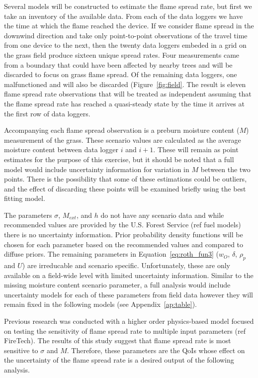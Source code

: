 \documentclass[11pt]{article}
\begin{document}
Several models will be constructed to estimate the flame spread rate, but first we take an inventory of the available data. From each of the data loggers we have the time at which the flame reached the device. If we consider flame spread in the downwind direction and take only point-to-point observations of the travel time from one device to the next, then the twenty data loggers embeded in a grid on the grass field produce sixteen unique spread rates. Four measurements came from a boundary that could have been affected by nearby trees and will be discarded to focus on grass flame spread. Of the remaining data loggers, one malfunctioned and will also be discarded (Figure~\ref{fig:field}. The result is eleven flame spread rate observations that will be treated as independent assuming that the flame spread rate has reached a quasi-steady state by the time it arrives at the first row of data loggers.

Accompanying each flame spread observation is a preburn moisture content ($M$) measurement of the grass. These scenario values are calculated as the average moisture content between data logger $i$ and $i+1$. These will remain as point estimates for the purpose of this exercise, but it should be noted that a full model would include uncertainty information for variation in $M$ between the two points. There is the possibility that some of these estimations could be outliers, and the effect of discarding these points will be examined briefly using the best fitting model.

The parameters $\sigma$, $M_{ext}$, and $h$ do not have any scenario data and while recommended values are provided by the U.S. Forest Service (ref fuel models) there is no uncertainty information. Prior probability density functions will be chosen for each parameter based on the recommended values and compared to diffuse priors. The remaining parameters in Equation~\ref{eq:roth_fun3} ($w_O$, $\delta$, $\rho_p$ and $U$) are irreducable and scenario specific. Unfortunately, these are only available on a field-wide level with limited uncertainty information. Similar to the missing moisture content scenario parameter, a full analysis would include uncertainty models for each of these parameters from field data however they will remain fixed in the following models (see Appendix~\ref{ap:table}).

Previous research was conducted with a higher order physics-based model focused on testing the sensitivity of flame spread rate to multiple input parameters (ref FireTech). The results of this study suggest that flame spread rate is most sensitive to $\sigma$ and $M$. Therefore, these parameters are the QoIs whose effect on the uncertainty of the flame spread rate is a desired output of the following analysis.
\end{document}
